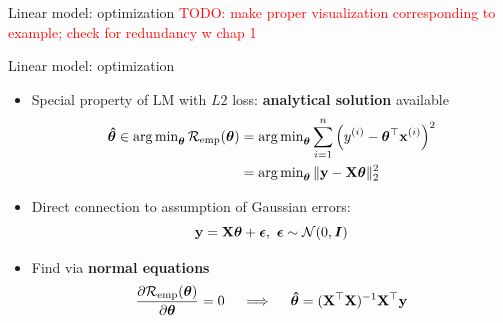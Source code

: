 \documentclass[11pt,compress,t,notes=noshow, xcolor=table]{beamer}
\begin{document}
\begin{frame}{Linear model: optimization}
\vfill
\textcolor{red}{TODO: make proper visualization corresponding to example; check 
for redundancy w chap 1}

\end{frame}


\begin{vbframe}{Linear model: optimization}

\begin{itemize}
    \item Special property of LM with $L2$ loss: \textbf{analytical solution}
    available
    \begin{align*}
        \bm{\hat\theta} \in 
        \operatorname{arg\,min}_{\bm{\theta}} \mathcal{R}_{\text{emp}}(\bm{\theta}) &=
        \operatorname{arg\,min}_{\bm{\theta}} \sum\limits_{i=1}^n \left(y^{(i)} - \bm{\theta}^\top \mathbf{x}^{(i)} \right)^2  \\
        &= \operatorname{arg\,min}_{\bm{\theta}} \| \mathbf{y} - \mathbf{X} \bm{\theta} \|^2_2
    \end{align*}
    \normalsize
    \item Direct connection to assumption of 
    Gaussian errors: $$\mathbf{y} = \mathbf{X} \bm{\theta} + \bm{\epsilon}, ~ \bm{\epsilon} \sim 
    \mathcal{N}(0, \boldsymbol{I})$$
    \item Find via \textbf{normal equations}
    $$
    \frac{\partial{\mathcal{R}_{\text{emp}}(\bm{\theta})}}{\partial \bm{\theta}} = 0 \quad\implies\quad \bm{\hat\theta} = (\mathbf{X}^\top \mathbf{X})^{-1} \mathbf{X}^\top \mathbf{y}
    $$
\end{itemize}

\end{vbframe}


\endlecture
\end{document}
